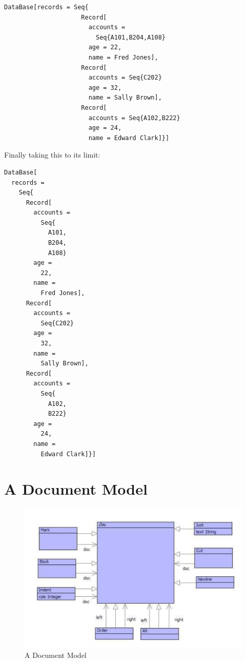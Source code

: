 \begin{lstlisting}
DataBase[records = Seq{
                     Record[
                       accounts =
                         Seq{A101,B204,A108}
                       age = 22,
                       name = Fred Jones],
                     Record[
                       accounts = Seq{C202}
                       age = 32,
                       name = Sally Brown],
                     Record[
                       accounts = Seq{A102,B222}
                       age = 24,
                       name = Edward Clark]}]
\end{lstlisting}Finally taking this to its limit:

\begin{lstlisting}
DataBase[
  records =
    Seq{
      Record[
        accounts =
          Seq{
            A101,
            B204,
            A108}
        age =
          22,
        name =
          Fred Jones],
      Record[
        accounts =
          Seq{C202}
        age =
          32,
        name =
          Sally Brown],
      Record[
        accounts =
          Seq{
            A102,
            B222}
        age =
          24,
        name =
          Edward Clark]}]
\end{lstlisting}
\section{A Document Model}

%
\begin{figure}
\begin{center}

\includegraphics[width=12cm]{Programming/PrettyPrint/Images/Docs.pdf}
\caption{A Document Model\label{fig:A-Document-Model}}

\end{center}
\end{figure}


